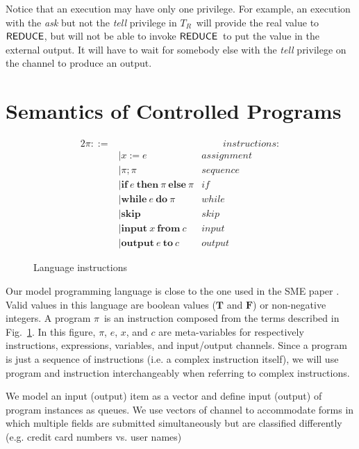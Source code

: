 \documentclass[10pt,a4paper,oneside]{article}
\def\TPV{\ensuremath{T_{R}}}
\def\VTRUE{\ensuremath{\textbf{T}}}
\def\VFALSE{\ensuremath{\textbf{F}}}
\def\chnl{\ensuremath{c}}
\def\sanserif#1{\ensuremath{\sf #1}}
\def\REDUCE{\ensuremath{\sanserif{REDUCE}}}
\def\Prog{\ensuremath{\pi}}
\def\comm{\ensuremath{\pi}}
\def\NASSG{assignment}
\def\NCOMP{sequence}
\def\NIF{if}
\def\NWHILE{while}
\def\NSKIP{skip}
\def\NINPUT{input}
\def\NOUTPUT{output}
\def\spaceIns{~~~~~~~~~~}
\begin{document}
Notice that an execution may have only one privilege. For example, an execution with the \emph{ask} but not the \emph{tell} privilege in \TPV\ will provide the real value to \REDUCE, but will not be able to invoke \REDUCE\ to put the value in the external output. It will have to wait for somebody else with the \emph{tell} privilege on the channel to produce an output.




\section{Semantics of Controlled Programs}\label{sec:formalization:proram}
\begin{figure}
\centering
\begin{alignat*}{2}
	\comm ::= &~& \spaceIns instructions:\\
		& |x:=e & \NASSG\\
		& |\comm;\comm & \NCOMP\\
		& |\textbf{if} ~e ~\textbf{then} ~\comm ~\textbf{else} ~\comm & \NIF\\
		& |\textbf{while} ~e ~\textbf{do} ~\comm & \NWHILE \\
		& |\textbf{skip} & \NSKIP\\
		& |\textbf{input} ~x ~\textbf{from} ~c & \NINPUT\\
		& |\textbf{output} ~e ~\textbf{to} ~c & \NOUTPUT
\end{alignat*}
\caption{Language instructions}
\label{fig:Comm:Standard}
\end{figure}


Our model programming language is close to the one used in the SME paper \cite{Devr-Pies-10-IEEESP}. Valid values in this language are boolean values ($\VTRUE$ and $\VFALSE$) or non-negative integers. A program \Prog\ is an instruction composed from the terms described in Fig.~\ref{fig:Comm:Standard}. In this figure, $\comm$, $e$, $x$, and $\chnl$ are meta-variables for respectively instructions, expressions, variables, and input/output channels. Since a program is just a sequence of instructions (i.e. a complex instruction itself), we will use program and instruction interchangeably when referring to complex instructions.

We model an input (output) item as a vector and define input (output) of program instances as queues. We use vectors of channel to accommodate forms in which multiple fields are submitted simultaneously but are classified differently (e.g. credit card numbers vs. user names)
\end{document}
